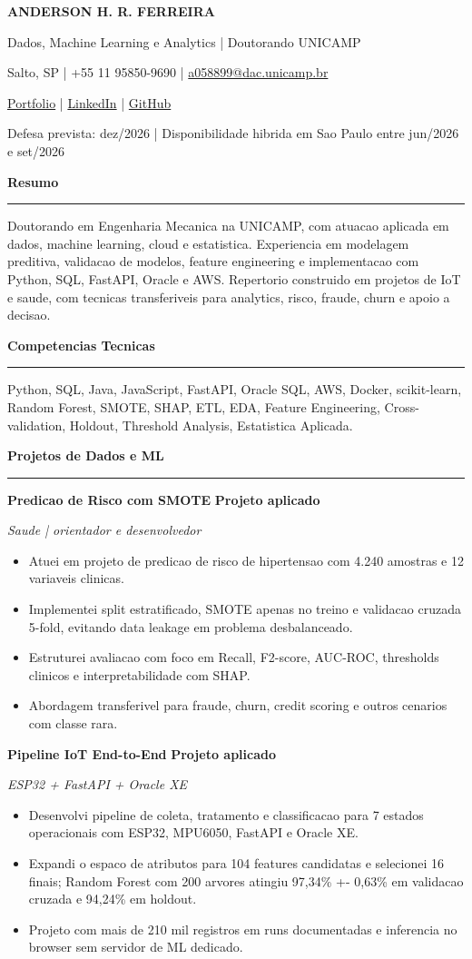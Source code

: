 \documentclass[10pt,a4paper]{article}
\newcommand{\cvsection}[1]{%
    \vspace{0.38em}
    {\large\bfseries #1}\par
    \vspace{0.08em}
    \hrule
    \vspace{0.18em}
}
\newcommand{\entry}[4]{%
    \textbf{#1} \hfill \textbf{#2}\par
    \textit{#3}\par
    #4
    \vspace{0.14em}
}
\begin{document}
{\LARGE\bfseries ANDERSON H. R. FERREIRA}\par
\vspace{0.18em}
{\normalsize Dados, Machine Learning e Analytics | Doutorando UNICAMP}\par
\vspace{0.28em}

Salto, SP | +55 11 95850-9690 | \href{mailto:a058899@dac.unicamp.br}{a058899@dac.unicamp.br}\par
\href{https://anderson-ferreira-83.github.io/}{Portfolio} | \href{https://www.linkedin.com/in/anderson-ferreira-1a473138/?locale=pt}{LinkedIn} | \href{https://github.com/anderson-ferreira-83}{GitHub}\par
Defesa prevista: dez/2026 | Disponibilidade hibrida em Sao Paulo entre jun/2026 e set/2026

\cvsection{Resumo}
Doutorando em Engenharia Mecanica na UNICAMP, com atuacao aplicada em dados, machine learning, cloud e estatistica. Experiencia em modelagem preditiva, validacao de modelos, feature engineering e implementacao com Python, SQL, FastAPI, Oracle e AWS. Repertorio construido em projetos de IoT e saude, com tecnicas transferiveis para analytics, risco, fraude, churn e apoio a decisao.

\cvsection{Competencias Tecnicas}
Python, SQL, Java, JavaScript, FastAPI, Oracle SQL, AWS, Docker, scikit-learn, Random Forest, SMOTE, SHAP, ETL, EDA, Feature Engineering, Cross-validation, Holdout, Threshold Analysis, Estatistica Aplicada.

\cvsection{Projetos de Dados e ML}
\entry{Predicao de Risco com SMOTE}{Projeto aplicado}{Saude | orientador e desenvolvedor}{
\begin{itemize}
    \item Atuei em projeto de predicao de risco de hipertensao com 4.240 amostras e 12 variaveis clinicas.
    \item Implementei split estratificado, SMOTE apenas no treino e validacao cruzada 5-fold, evitando data leakage em problema desbalanceado.
    \item Estruturei avaliacao com foco em Recall, F2-score, AUC-ROC, thresholds clinicos e interpretabilidade com SHAP.
    \item Abordagem transferivel para fraude, churn, credit scoring e outros cenarios com classe rara.
\end{itemize}
}

\entry{Pipeline IoT End-to-End}{Projeto aplicado}{ESP32 + FastAPI + Oracle XE}{
\begin{itemize}
    \item Desenvolvi pipeline de coleta, tratamento e classificacao para 7 estados operacionais com ESP32, MPU6050, FastAPI e Oracle XE.
    \item Expandi o espaco de atributos para 104 features candidatas e selecionei 16 finais; Random Forest com 200 arvores atingiu 97,34\% +- 0,63\% em validacao cruzada e 94,24\% em holdout.
    \item Projeto com mais de 210 mil registros em runs documentadas e inferencia no browser sem servidor de ML dedicado.
\end{itemize}
}
\end{document}
